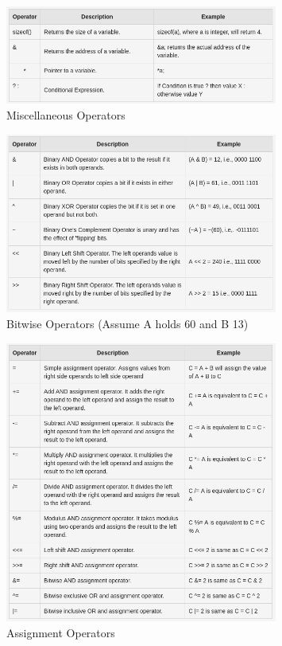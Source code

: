 \documentclass[a4paper, 11pt]{article}
\begin{document}
\begin{figure}[htb!]
    \centering
    \includegraphics[width=0.8\textwidth]{misc_oper}
    \caption{Miscellaneous Operators}
    \label{fig:misc_oper}
\end{figure}

\newpage

\begin{figure}[htb!]
    \centering
    \includegraphics[width=0.8\textwidth]{bit_oper}
    \caption{Bitwise Operators (Assume A holds 60 and B 13)}
    \label{fig:bit_oper}
\end{figure}

\begin{figure}[htb!]
    \centering
    \includegraphics[width=0.8\textwidth]{assign_oper}
    \caption{Assignment Operators}
    \label{fig:assign_oper}
\end{figure}
\end{document}
